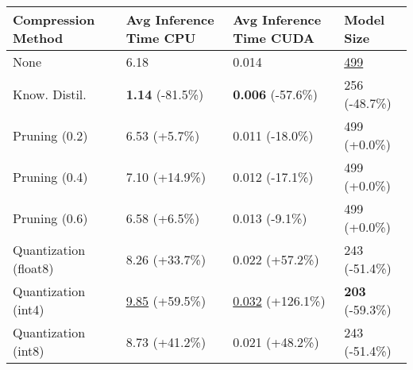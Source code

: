 \begin{tabular}{llll}
\toprule
\textbf{Compression Method} & \textbf{Avg Inference Time CPU} & \textbf{Avg Inference Time CUDA} & \textbf{Model Size} \\
\midrule
None & 6.18 & 0.014 & \underline{499} \\
Know. Distil. & \textbf{1.14} (-81.5\%) & \textbf{0.006} (-57.6\%) & 256 (-48.7\%) \\
Pruning (0.2) & 6.53 (+5.7\%) & 0.011 (-18.0\%) & 499 (+0.0\%) \\
Pruning (0.4) & 7.10 (+14.9\%) & 0.012 (-17.1\%) & 499 (+0.0\%) \\
Pruning (0.6) & 6.58 (+6.5\%) & 0.013 (-9.1\%) & 499 (+0.0\%) \\
Quantization (float8) & 8.26 (+33.7\%) & 0.022 (+57.2\%) & 243 (-51.4\%) \\
Quantization (int4) & \underline{9.85} (+59.5\%) & \underline{0.032} (+126.1\%) & \textbf{203} (-59.3\%) \\
Quantization (int8) & 8.73 (+41.2\%) & 0.021 (+48.2\%) & 243 (-51.4\%) \\
\bottomrule
\end{tabular}
